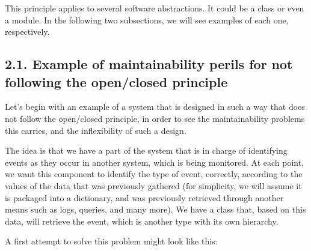 \documentclass[a4paper,10pt,english]{sphinxmanual}
\begin{document}
This principle applies to several software abstractions. It could be a class or even a module.
In the following two subsections, we will see examples of each one, respectively.


\subsection{2.1. Example of maintainability perils for not following the open/closed principle}
\label{\detokenize{chapters/4_solid_principles/index:example-of-maintainability-perils-for-not-following-the-open-closed-principle}}
Let’s begin with an example of a system that is designed in such a way that does not follow
the open/closed principle, in order to see the maintainability problems this carries, and the
inflexibility of such a design.

The idea is that we have a part of the system that is in charge of identifying events as they
occur in another system, which is being monitored. At each point, we want this component
to identify the type of event, correctly, according to the values of the data that was
previously gathered (for simplicity, we will assume it is packaged into a dictionary, and
was previously retrieved through another means such as logs, queries, and many more).
We have a class that, based on this data, will retrieve the event, which is another type with
its own hierarchy.

A first attempt to solve this problem might look like this:
\end{document}
